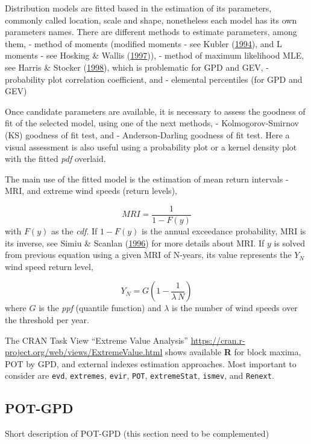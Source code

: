 \documentclass[12pt,oneside]{reedthesis}
\begin{document}
Distribution models are fitted based in the estimation of its parameters, commonly called location, scale and shape, nonetheless each model has its own parameters names. There are different methods to estimate parameters, among them, - method of moments (modified moments - see Kubler (\protect\hyperlink{ref-Kubler1994}{1994}), and L moments - see Hosking \& Wallis (\protect\hyperlink{ref-Hosking1997}{1997})), - method of maximum likelihood MLE, see Harris \& Stocker (\protect\hyperlink{ref-Harris1994}{1998}), which is problematic for GPD and GEV, - probability plot correlation coefficient, and - elemental percentiles (for GPD and GEV)

Once candidate parameters are available, it is necessary to assess the goodness of fit of the selected model, using one of the next methods, - Kolmogorov-Smirnov (KS) goodness of fit test, and - Anderson-Darling goodness of fit test. Here a visual assessment is also useful using a probability plot or a kernel density plot with the fitted \emph{pdf} overlaid.

The main use of the fitted model is the estimation of mean return intervals - MRI, and extreme wind speeds (return levels),

\[
MRI=\frac{1}{1-F(y)}
\]
with \(F(y)\) as the \emph{cdf}. If \(1-F(y)\) is the annual exceedance probability, MRI is its inverse, see Simiu \& Scanlan (\protect\hyperlink{ref-Simiu1996}{1996}) for more details about MRI. If \(y\) is solved from previous equation using a given MRI of N-years, its value represents the \(Y_N\) wind speed return level,

\[
Y_N = G\left(1-\frac{1}{\lambda\,N}\right)
\]
where \(G\) is the \emph{ppf} (quantile function) and \(\lambda\) is the number of wind speeds over the threshold per year.

The CRAN Task View ``Extreme Value Analysis'' \url{https://cran.r-project.org/web/views/ExtremeValue.html} shows available \textbf{R} for block maxima, POT by GPD, and external indexes estimation approaches. Most important to consider are \texttt{evd}, \texttt{extremes}, \texttt{evir}, \texttt{POT}, \texttt{extremeStat}, \texttt{ismev}, and \texttt{Renext}.

\hypertarget{pot-gpd}{%
\subsection{POT-GPD}\label{pot-gpd}}

Short description of POT-GPD (this section need to be complemented)
\end{document}
